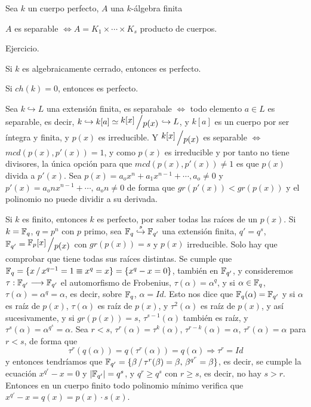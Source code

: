 Sea $k$ un cuerpo perfecto, $A$ una $k$-\'algebra finita
\begin{prop}
    $A$ es separable $\iff A = K_1 \times \cdots \times K_s$ producto de cuerpos. 
\end{prop}
\begin{dem}
    Ejercicio.
\end{dem}
\begin{ejem}
    Si $k$ es algebraicamente cerrado, entonces es perfecto. 

    Si $ch(k)=0$, entonces es perfecto. 

    Sea $k \hookrightarrow L$ una extensi\'on finita, es separabale $\iff$ todo elemento $a\in L$ es separable, es decir, $k \hookrightarrow k[a] \simeq \modulo{k[x]}{p(x)} \hookrightarrow L$, y $k[a]$ es un cuerpo por ser \'integra y finita, y $p(x)$ es irreducible. Y $\modulo{k[x]}{p(x)}$ es separable $\iff$ $mcd(p(x),p'(x))=1$, y como $p(x)$ es irreducible y por tanto no tiene divisores, la \'unica opci\'on para que $mcd(p(x),p'(x))\neq 1$ es que $p(x)$ divida a $p'(x)$. Sea $p(x) = a_o x^n + a_1 x^{n-1} + \cdots , a_o \neq 0$ y $p'(x)=a_o nx^{n-1} + \cdots, \, a_o n \neq 0 $ de forma que $gr(p'(x))<gr(p(x))$ y el polinomio no puede dividir a su derivada.  

    Si $k$ es finito, entonces $k$ es perfecto, por saber todas las ra\'ices de un $p(x)$. Si $k = \mathbb{F}_q$, $q=p^n$ con $p$ primo, sea $\mathbb{F}_q \overset{s}{\hookrightarrow} \mathbb{F}_{q'}$ una extensi\'on finita, $q'=q^s$, $\bb F_{q'} = \modulo{\bb F_p[x]}{p(x)}$ con $gr(p(x)) = s$ y $p(x)$ irreducible. Solo hay que comprobar que tiene todas sus ra\'ices distintas. Se cumple que $\mathbb{F}_q = \{x\,/\,x^{q-1} = 1 \equiv x^q=x \} = \{x^q-x=0\}$, tambi\'en en $\mathbb{F}_{q'}$, y consideremos $\tau: \mathbb{F}_{q'} \longrightarrow \mathbb{F}_{q'}$ el automorfismo de Frobenius, $\tau(\alpha) = \alpha^q$, y si $\alpha \in \mathbb{F}_q$, $\tau(\alpha) = \alpha^q = \alpha$, es decir, sobre $\mathbb{F}_q$, $\alpha =Id$. Esto nos dice que $\mathbb{F}_q(\alpha) = \mathbb{F}_{q'}$ y si $\alpha$ es ra\'iz de $p(x)$, $\tau(\alpha)$ es ra\'iz de $p(x)$, y $\tau^2(\alpha)$ es ra\'iz de $p(x)$, y as\'i sucesivamente, y si $gr(p(x))=s$, $\tau^{s-1}(\alpha)$ tambi\'en es ra\'iz, y $\tau^{s}(\alpha) = \alpha^{q^s} = \alpha$. Sea $r<s$, $\tau^r(\alpha) = \tau^{k}(\alpha)$, $\tau^{r-k}(\alpha) = \alpha$, $\tau^r(\alpha) = \alpha$ para $r<s$, de forma que 
    $$\tau^r(q(\alpha)) = q(\tau^r(\alpha)) = q(\alpha) \Rightarrow \tau^r = Id$$
    y entonces tendr\'iamos que $\mathbb{F}_{q'} = \{\beta \,/ \, \tau^r(\beta) = \beta, \, \beta^{q^r} = \beta\}$, es decir, se cumple la ecuación $x^{q^r} - x=0$ y $|\mathbb{F}_{q'}| =q^s$, y $q^r \geq q^s$ con $r\geq s$, es decir, no hay $s>r$. Entonces en un cuerpo finito todo polinomio m\'inimo verifica que $x^{q'}-x=q(x) = p(x)\cdot s(x)$.
\end{ejem}
